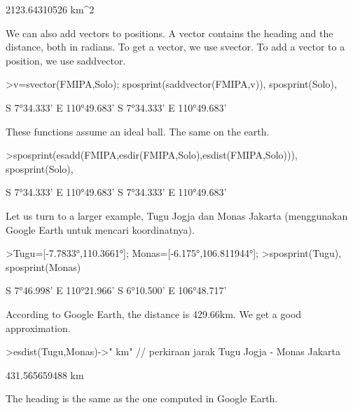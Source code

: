 \documentclass{article}
\begin{document}
\begin{eulernotebook}
\begin{eulercomment}
\begin{eulercomment}
\begin{eulercomment}
\begin{eulercomment}
\begin{eulercomment}
\begin{eulercomment}
\begin{eulercomment}
\begin{eulercomment}
\begin{euleroutput}
  2123.64310526 km^2
\end{euleroutput}
\begin{eulercomment}
We can also add vectors to positions. A vector contains the heading
and the distance, both in radians. To get a vector, we use svector. To
add a vector to a position, we use saddvector.
\end{eulercomment}
\begin{eulerprompt}
>v=svector(FMIPA,Solo); sposprint(saddvector(FMIPA,v)), sposprint(Solo),
\end{eulerprompt}
\begin{euleroutput}
  S 7°34.333' E 110°49.683'
  S 7°34.333' E 110°49.683'
\end{euleroutput}
\begin{eulercomment}
These functions assume an ideal ball. The same on the earth.
\end{eulercomment}
\begin{eulerprompt}
>sposprint(esadd(FMIPA,esdir(FMIPA,Solo),esdist(FMIPA,Solo))), sposprint(Solo),
\end{eulerprompt}
\begin{euleroutput}
  S 7°34.333' E 110°49.683'
  S 7°34.333' E 110°49.683'
\end{euleroutput}
\begin{eulercomment}
Let us turn to a larger example, Tugu Jogja dan Monas Jakarta (menggunakan Google Earth
untuk mencari koordinatnya).
\end{eulercomment}
\begin{eulerprompt}
>Tugu=[-7.7833°,110.3661°]; Monas=[-6.175°,106.811944°];
>sposprint(Tugu), sposprint(Monas)
\end{eulerprompt}
\begin{euleroutput}
  S 7°46.998' E 110°21.966'
  S 6°10.500' E 106°48.717'
\end{euleroutput}
\begin{eulercomment}
According to Google Earth, the distance is 429.66km. We get a good
approximation.
\end{eulercomment}
\begin{eulerprompt}
>esdist(Tugu,Monas)->" km" // perkiraan jarak Tugu Jogja - Monas Jakarta
\end{eulerprompt}
\begin{euleroutput}
  431.565659488 km
\end{euleroutput}
\begin{eulercomment}
The heading is the same as the one computed in Google Earth.

\end{eulercomment}
\end{eulercomment}
\end{eulercomment}
\end{eulercomment}
\end{eulercomment}
\end{eulercomment}
\end{eulercomment}
\end{eulercomment}
\end{eulercomment}
\end{eulernotebook}
\end{document}
